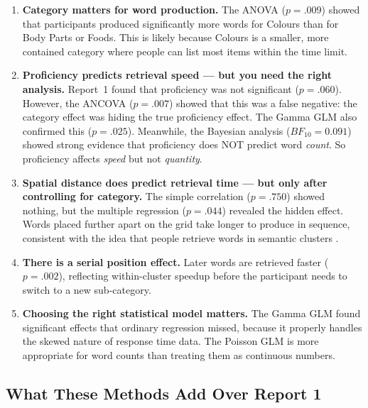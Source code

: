 \documentclass[12pt, a4paper]{article}
\begin{document}
\begin{enumerate}
    \item \textbf{Category matters for word production.} The ANOVA ($p = .009$) showed that participants produced significantly more words for Colours than for Body Parts or Foods. This is likely because Colours is a smaller, more contained category where people can list most items within the time limit.

    \item \textbf{Proficiency predicts retrieval speed --- but you need the right analysis.} Report~1 found that proficiency was not significant ($p = .060$). However, the ANCOVA ($p = .007$) showed that this was a false negative: the category effect was hiding the true proficiency effect. The Gamma GLM also confirmed this ($p = .025$). Meanwhile, the Bayesian analysis ($BF_{10} = 0.091$) showed strong evidence that proficiency does NOT predict word \textit{count}. So proficiency affects \textit{speed} but not \textit{quantity}.

    \item \textbf{Spatial distance does predict retrieval time --- but only after controlling for category.} The simple correlation ($p = .750$) showed nothing, but the multiple regression ($p = .044$) revealed the hidden effect. Words placed further apart on the grid take longer to produce in sequence, consistent with the idea that people retrieve words in semantic clusters \citep{troyer1997clustering}.

    \item \textbf{There is a serial position effect.} Later words are retrieved faster ($p = .002$), reflecting within-cluster speedup before the participant needs to switch to a new sub-category.

    \item \textbf{Choosing the right statistical model matters.} The Gamma GLM found significant effects that ordinary regression missed, because it properly handles the skewed nature of response time data. The Poisson GLM is more appropriate for word counts than treating them as continuous numbers.
\end{enumerate}

\subsection{What These Methods Add Over Report 1}
\end{document}

